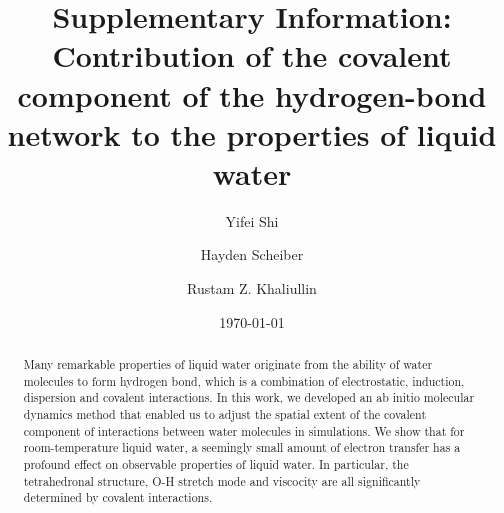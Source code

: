 \documentclass[aps,prl,reprint,amsmath,amssymb]{revtex4-1}
\newcommand*{\MAINTEXT}{}
\begin{document}
\newcommand{\Ang}{\ensuremath{\mathring{\text{A}}}}
\newcommand{\ltwid}{\mathrel{\raise.3ex\hbox{$<$\kern-.75em\lower1ex\hbox{$\sim$}}}}
\newcommand{\gtwid}{\mathrel{\raise.3ex\hbox{$>$\kern-.75em\lower1ex\hbox{$\sim$}}}}
\newcommand{\bra}{\langle}
\newcommand{\ket}{\rangle}
\newcommand{\sill}{\psi}
\newcommand{\trace}{{\rm Tr}}
\newcommand{\ntilde}{\tilde{n}}
\newcommand{\stilde}{\tilde{s}}
\newcommand{\atilde}{\tilde{\alpha}}
\newcommand{\new}{\color{red}}
\newcommand{\old}{\color{black}}
\newcommand{\bea}{\begin{eqnarray}}
\newcommand{\eea}{\end{eqnarray}}
\def\nn{\nonumber\\}



\ifdefined\MAINTEXT
\else
	\clearpage
	\setcounter{figure}{0}
	\setcounter{page}{1}
	\renewcommand{\thefigure}{S\arabic{figure}}
\fi

\title{
\ifdefined\MAINTEXT
\else
Supplementary Information: \\
\fi
Contribution of the covalent component of the hydrogen-bond network to the properties of liquid water
}

\author{Yifei Shi}
\author{Hayden Scheiber}
\author{Rustam Z. Khaliullin}

\date{\today}

\ifdefined\MAINTEXT

\begin{abstract}
Many remarkable properties of liquid water originate from the ability of water molecules to form hydrogen bond, which is a combination of electrostatic, induction, dispersion and covalent interactions. 
In this work, we developed an ab initio molecular dynamics method that enabled us to adjust the spatial extent of the covalent component of interactions between water molecules in simulations. 
We show that for room-temperature liquid water, a seemingly small amount of electron transfer has a profound effect on observable properties of liquid water. 
In particular, the tetrahedronal structure, O-H stretch mode and viscocity are all significantly determined by covalent interactions.


\end{abstract}
\maketitle
\end{document}

